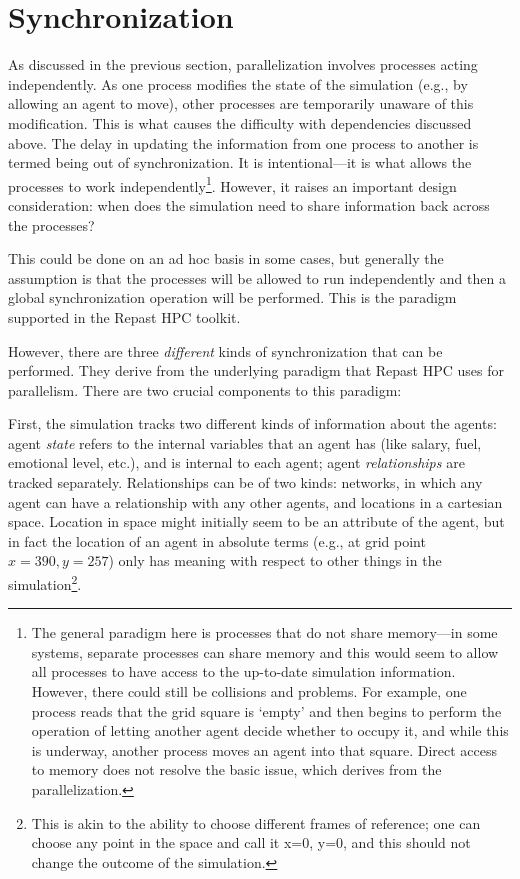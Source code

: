 \section{Synchronization}
As discussed in the previous section, parallelization involves processes acting independently. As one process modifies the state of the simulation (e.g., by allowing an agent to move), other processes are temporarily unaware of this modification. This is what causes the difficulty with dependencies discussed above. The delay in updating the information from one process to another is termed being out of synchronization. It is intentional---it is what allows the processes to work independently\footnote{The general paradigm here is processes that do not share memory---in some systems, separate processes can share memory and this would seem to allow all processes to have access to the up-to-date simulation information. However, there could still be collisions and problems. For example, one process reads that the grid square is `empty' and then begins to perform the operation of letting another agent decide whether to occupy it, and while this is underway, another process moves an agent into that square. Direct access to memory does not resolve the basic issue, which derives from the parallelization.}. However, it raises an important design consideration: when does the simulation need to share information back across the processes?

This could be done on an ad hoc basis in some cases, but generally the assumption is that the processes will be allowed to run independently and then a global synchronization operation will be performed. This is the paradigm supported in the Repast HPC toolkit.

However, there are three \textit{different} kinds of synchronization that can be performed. They derive from the underlying paradigm that Repast HPC uses for parallelism. There are two crucial components to this paradigm:

First, the simulation tracks two different kinds of information about the agents: agent \textit{state} refers to the internal variables that an agent has (like salary, fuel, emotional level, etc.), and is internal to each agent; agent \textit{relationships} are tracked separately. Relationships can be of two kinds: networks, in which any agent can have a relationship with any other agents, and locations in a cartesian space. Location in space might initially seem to be an attribute of the agent, but in fact the location of an agent in absolute terms (e.g., at grid point $x=390, y=257$) only has meaning with respect to other things in the simulation\footnote{This is akin to the ability to choose different frames of reference; one can choose any point in the space and call it x=0, y=0, and this should not change the outcome of the simulation.}.

